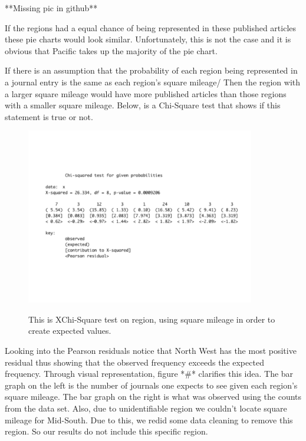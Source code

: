 \documentclass[12pt, letterpaper]{article}
\begin{document}
**Missing pic in github**

If the regions had a equal chance of being represented in these published articles these pie charts would look similar. Unfortunately, this is not the case and it is obvious that Pacific takes up the majority of the pie chart.

If there is an assumption that the probability of each region being represented in a journal entry is the same as each region's square mileage/ Then the region with a larger square mileage would have more published articles than those regions with a smaller square mileage. Below, is a Chi-Square test that shows if this statement is true or not.

\begin{figure}[h]
\begin{center}
\includegraphics[width=10cm]{RegionChiSquare2.pdf}
\label{fig: Region XChi-Square with Square Mileage}
\caption{This is XChi-Square test on region, using square mileage in order to create expected values.}
\end{center}
\end{figure}

Looking into the Pearson residuals notice that North West has the most positive residual thus showing that the observed frequency exceeds the expected frequency. Through visual representation, figure *#* clarifies this idea. The bar graph on the left is the number of journals one expects to see given each region's square mileage. The bar graph on the right is what was observed using the counts from the data set. Also, due to unidentifiable region we couldn't locate square mileage for Mid-South. Due to this, we redid some data cleaning to remove this region. So our results do not include this specific region.
\end{document}
